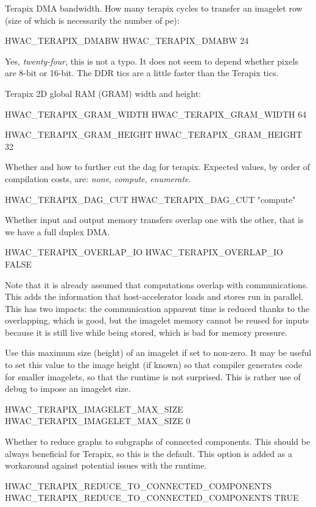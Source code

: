 \documentclass[a4paper]{report}
\begin{document}
Terapix DMA bandwidth. How many terapix cycles to transfer an imagelet row
(size of which is necessarily the number of pe):
\begin{PipsProp}{HWAC_TERAPIX_DMABW}
HWAC_TERAPIX_DMABW 24
\end{PipsProp}
Yes, \emph{twenty-four}, this is not a typo.
It does not seem to depend whether pixels are 8-bit or 16-bit.
The DDR tics are a little faster than the Terapix tics.

Terapix 2D global RAM (GRAM) width and height:
\begin{PipsProp}{HWAC_TERAPIX_GRAM_WIDTH}
HWAC_TERAPIX_GRAM_WIDTH 64
\end{PipsProp}
\begin{PipsProp}{HWAC_TERAPIX_GRAM_HEIGHT}
HWAC_TERAPIX_GRAM_HEIGHT 32
\end{PipsProp}

Whether and how to further cut the dag for terapix.
Expected values, by order of compilation costs, are:
\emph{none}, \emph{compute}, \emph{enumerate}.
\begin{PipsProp}{HWAC_TERAPIX_DAG_CUT}
HWAC_TERAPIX_DAG_CUT "compute"
\end{PipsProp}

Whether input and output memory transfers overlap one with the other,
that is we have a full duplex DMA.
\begin{PipsProp}{HWAC_TERAPIX_OVERLAP_IO}
HWAC_TERAPIX_OVERLAP_IO FALSE
\end{PipsProp}
Note that it is already assumed that computations overlap with
communications. This adds the information that host-accelerator
loads and stores run in parallel. This has two impacts: the
communication apparent time is reduced thanks to the overlapping,
which is good, but the imagelet memory cannot be reused for inputs
because it is still live while being stored, which is bad for
memory pressure.

Use this maximum size (height) of an imagelet if set to non-zero.
It may be useful to set this value to the image height (if known) so
that compiler generates code for smaller imagelets, so that the
runtime is not surprised. This is rather use of debug to impose
an imagelet size.
\begin{PipsProp}{HWAC_TERAPIX_IMAGELET_MAX_SIZE}
HWAC_TERAPIX_IMAGELET_MAX_SIZE 0
\end{PipsProp}

Whether to reduce graphs to subgraphs of connected components.
This should be always beneficial for Terapix, so this is the default.
This option is added as a workaround against potential issues with the runtime.
\begin{PipsProp}{HWAC_TERAPIX_REDUCE_TO_CONNECTED_COMPONENTS}
HWAC_TERAPIX_REDUCE_TO_CONNECTED_COMPONENTS TRUE
\end{PipsProp}
\end{document}
